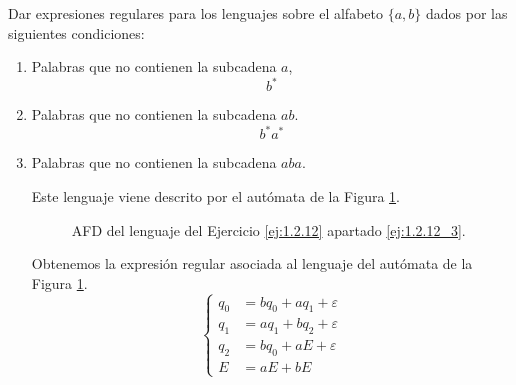 \begin{ejercicio} \label{ej:1.2.12}
    Dar expresiones regulares para los lenguajes sobre el alfabeto $\{a, b\}$ dados por las siguientes condiciones:
    \begin{enumerate}
        \item Palabras que no contienen la subcadena $a$,
        \begin{equation*}
            b^*
        \end{equation*}
        \item Palabras que no contienen la subcadena $ab$.
        \begin{equation*}
            b^*a^*
        \end{equation*}
        \item \label{ej:1.2.12_3} %
        Palabras que no contienen la subcadena $aba$.
        
        Este lenguaje viene descrito por el autómata de la Figura \ref{fig:ej:1.2.12_3}.
        \begin{figure}
            \centering
            \caption{AFD del lenguaje del Ejercicio \ref{ej:1.2.12} apartado \ref{ej:1.2.12_3}.}
            \label{fig:ej:1.2.12_3}
        \end{figure}

        Obtenemos la expresión regular asociada al lenguaje del autómata de la Figura \ref{fig:ej:1.2.12_3}.
        \begin{equation*}
            \begin{cases}
                q_0 &= bq_0 + aq_1 + \varepsilon\\
                q_1 &= aq_1 + bq_2 + \varepsilon\\
                q_2 &= bq_0 + aE + \varepsilon\\
                E &= aE + bE
            \end{cases}
        \end{equation*}


\end{enumerate}
\end{ejercicio}
